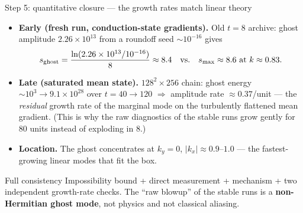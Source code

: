 \documentclass[aspectratio=169,10pt]{beamer}
\begin{document}
\begin{frame}{Step 5: quantitative closure --- the growth rates match linear theory}
  \begin{itemize}
    \item \textbf{Early (fresh run, conduction-state gradients).}
      Old $t{=}8$ archive: ghost amplitude $2.26\times10^{13}$ from a roundoff seed
      $\sim10^{-16}$ gives
      \[
        s_{\rm ghost} = \frac{\ln(2.26\times10^{13}/10^{-16})}{8} \approx 8.4
        \quad\text{vs.}\quad
        s_{\max} \approx 8.6 \ \text{at } k\approx0.83 .
      \]
    \item \textbf{Late (saturated mean state).} $128^2{\times}256$ chain:
      ghost energy $\sim10^{3}\to 9.1\times10^{28}$ over $t=40\to120$
      $\Rightarrow$ amplitude rate $\approx 0.37$/unit --- the \emph{residual}
      growth rate of the marginal mode on the turbulently flattened mean gradient.
      (This is why the raw diagnostics of the stable runs grow gently for 80 units
      instead of exploding in 8.)
    \item \textbf{Location.} The ghost concentrates at $k_y{=}0$,
      $|k_x| \approx 0.9$--$1.0$ --- the fastest-growing linear modes that fit the
      box.
  \end{itemize}
  \begin{alertblock}{Full consistency}
    Impossibility bound + direct measurement + mechanism + two independent
    growth-rate checks. The ``raw blowup'' of the stable runs is a
    \textbf{non-Hermitian ghost mode}, not physics and not classical aliasing.
  \end{alertblock}
\end{frame}
\end{document}
